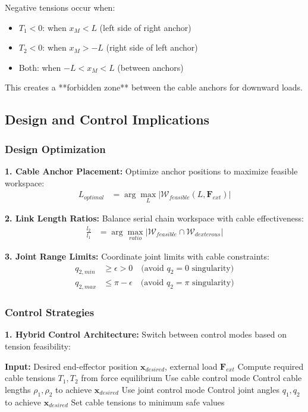 Negative tensions occur when:
\begin{itemize}
    \item $T_1 < 0$: when $x_M < L$ (left side of right anchor)
    \item $T_2 < 0$: when $x_M > -L$ (right side of left anchor)  
    \item Both: when $-L < x_M < L$ (between anchors)
\end{itemize}

This creates a **forbidden zone** between the cable anchors for downward loads.

\subsection{Design and Control Implications}

\subsubsection{Design Optimization}
\textbf{1. Cable Anchor Placement:}
Optimize anchor positions to maximize feasible workspace:
\begin{align}
L_{optimal} &= \arg\max_L |\mathcal{W}_{feasible}(L, \bm{F}_{ext})|
\end{align}

\textbf{2. Link Length Ratios:}
Balance serial chain workspace with cable effectiveness:
\begin{align}
\frac{l_2}{l_1} &= \arg\max_{ratio} |\mathcal{W}_{feasible} \cap \mathcal{W}_{dexterous}|
\end{align}

\textbf{3. Joint Range Limits:}
Coordinate joint limits with cable constraints:
\begin{align}
q_{2,min} &\geq \epsilon > 0 \quad \text{(avoid } q_2 = 0 \text{ singularity)} \\
q_{2,max} &\leq \pi - \epsilon \quad \text{(avoid } q_2 = \pi \text{ singularity)}
\end{align}

\subsubsection{Control Strategies}
\textbf{1. Hybrid Control Architecture:}
Switch between control modes based on tension feasibility:
\begin{algorithm}[H]
\caption{Hybrid Cable-Joint Control}
\begin{algorithmic}
\STATE \textbf{Input:} Desired end-effector position $\bm{x}_{desired}$, external load $\bm{F}_{ext}$
\STATE Compute required cable tensions $T_1, T_2$ from force equilibrium
    \STATE Use cable control mode
    \STATE Control cable lengths $\rho_1, \rho_2$ to achieve $\bm{x}_{desired}$
\ELSE
    \STATE Use joint control mode
    \STATE Control joint angles $q_1, q_2$ to achieve $\bm{x}_{desired}$
    \STATE Set cable tensions to minimum safe values
\ENDIF
\end{algorithmic}
\end{algorithm}

